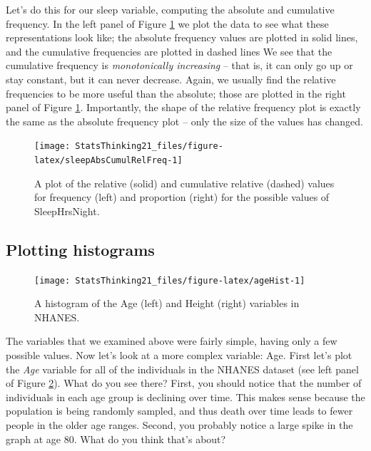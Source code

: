 \documentclass[12pt,]{book}
\theoremstyle{definition}
\theoremstyle{definition}
\theoremstyle{definition}
\theoremstyle{remark}
\begin{document}
Let's do this for our sleep variable, computing the absolute and cumulative frequency. In the left panel of Figure \ref{fig:sleepAbsCumulRelFreq} we plot the data to see what these representations look like; the absolute frequency values are plotted in solid lines, and the cumulative frequencies are plotted in dashed lines We see that the cumulative frequency is \emph{monotonically increasing} -- that is, it can only go up or stay constant, but it can never decrease. Again, we usually find the relative frequencies to be more useful than the absolute; those are plotted in the right panel of Figure \ref{fig:sleepAbsCumulRelFreq}. Importantly, the shape of the relative frequency plot is exactly the same as the absolute frequency plot -- only the size of the values has changed.

\begin{figure}
\texttt{[image: StatsThinking21\_files/figure-latex/sleepAbsCumulRelFreq-1]} \caption{A plot of the relative (solid) and cumulative relative (dashed) values for frequency (left) and proportion (right) for the possible values of SleepHrsNight.}\label{fig:sleepAbsCumulRelFreq}
\end{figure}

\hypertarget{plotting-histograms}{%
\subsection{Plotting histograms}\label{plotting-histograms}}

\begin{figure}
\texttt{[image: StatsThinking21\_files/figure-latex/ageHist-1]} \caption{A histogram of the Age (left) and Height (right) variables in NHANES.}\label{fig:ageHist}
\end{figure}

The variables that we examined above were fairly simple, having only a few possible values. Now let's look at a more complex variable: Age. First let's plot the \emph{Age} variable for all of the individuals in the NHANES dataset (see left panel of Figure \ref{fig:ageHist}). What do you see there? First, you should notice that the number of individuals in each age group is declining over time. This makes sense because the population is being randomly sampled, and thus death over time leads to fewer people in the older age ranges. Second, you probably notice a large spike in the graph at age 80. What do you think that's about?
\end{document}
